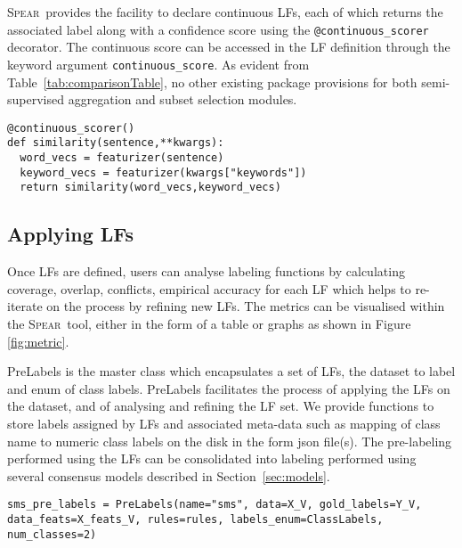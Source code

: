 \documentclass[11pt]{article}
\newcommand{\spear}{\mbox{\textsc{Spear}}}
\begin{document}
\spear\ provides the facility to declare continuous LFs, each of which returns the associated label along with a confidence score using the \texttt{@continuous\_scorer} decorator. 
The continuous score can be accessed in the LF definition through the keyword argument \texttt{continuous\_score}. As evident from Table~\ref{tab:comparisonTable}, no other existing package provisions for both semi-supervised aggregation and subset selection modules.
\begin{lstlisting}
@continuous_scorer()
def similarity(sentence,**kwargs):
  word_vecs = featurizer(sentence)
  keyword_vecs = featurizer(kwargs["keywords"])
  return similarity(word_vecs,keyword_vecs)
\end{lstlisting}



\subsection{Applying LFs}%
Once LFs are defined, users can analyse labeling functions by calculating coverage, overlap, conflicts, empirical accuracy for each LF which helps to re-iterate on the process by refining new LFs. The metrics can be visualised within the \spear\ tool, either in the form of a table or graphs as shown in Figure \ref{fig:metric}.

PreLabels is the master class which encapsulates a set of LFs, the dataset to label and enum of class labels. PreLabels facilitates the process of applying the LFs on the dataset, and of analysing and refining the LF set. We provide functions to store labels assigned by LFs %
and associated meta-data such as mapping of class name to numeric class labels on the disk in the form json file(s). The pre-labeling performed using the LFs can be consolidated into labeling performed using several consensus models described in Section~\ref{sec:models}.
\begin{lstlisting}
sms_pre_labels = PreLabels(name="sms", data=X_V, gold_labels=Y_V, 
data_feats=X_feats_V, rules=rules, labels_enum=ClassLabels, num_classes=2)
\end{lstlisting}
\end{document}
